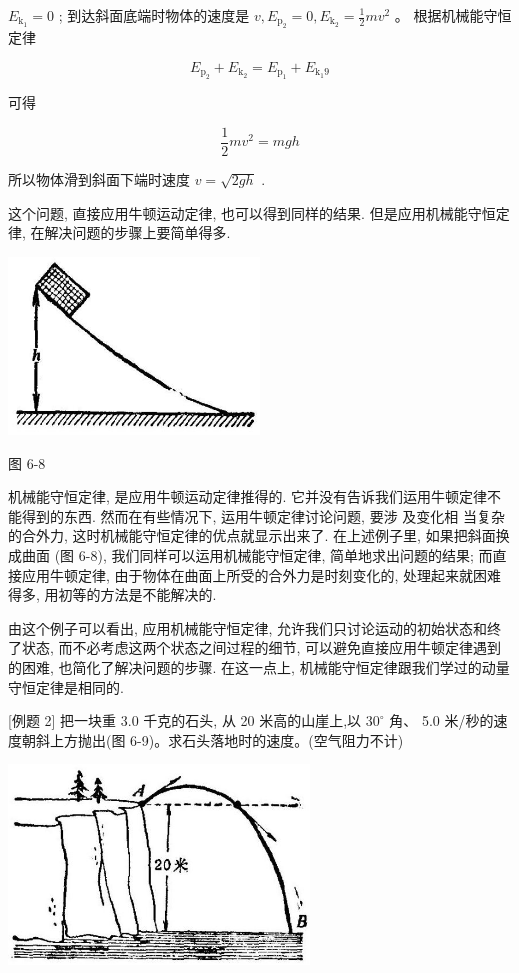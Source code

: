 \documentclass[10pt]{article}
\begin{document}
\({E}_{{\mathrm{k}}_{1}} = 0\) ; 到达斜面底端时物体的速度是 \(v,{E}_{{\mathrm{p}}_{2}} = 0,{E}_{{\mathrm{k}}_{2}} = \frac{1}{2}m{v}^{2}\) 。 根据机械能守恒定律

\[
{E}_{{\mathrm{p}}_{2}} + {E}_{{\mathrm{k}}_{2}} = {E}_{{\mathrm{p}}_{1}} + {E}_{{\mathrm{k}}_{1}9}
\]

可得

\[
\frac{1}{2}m{v}^{2} = {mgh}
\]

所以物体滑到斜面下端时速度 \(v = \sqrt{2gh}\) .

这个问题, 直接应用牛顿运动定律, 也可以得到同样的结果. 但是应用机械能守恒定律, 在解决问题的步骤上要简单得多.

\begin{center}
\includegraphics[max width=0.5\textwidth]{images/01912d55-147c-70aa-b0e0-1782a122f948_184_726188.jpg}
\end{center}

图 6-8

机械能守恒定律, 是应用牛顿运动定律推得的. 它并没有告诉我们运用牛顿定律不能得到的东西. 然而在有些情况下, 运用牛顿定律讨论问题, 要涉 及变化相 当复杂的合外力, 这时机械能守恒定律的优点就显示出来了. 在上述例子里, 如果把斜面换成曲面 (图 6-8), 我们同样可以运用机械能守恒定律, 简单地求出问题的结果; 而直接应用牛顿定律, 由于物体在曲面上所受的合外力是时刻变化的, 处理起来就困难得多, 用初等的方法是不能解决的.

由这个例子可以看出, 应用机械能守恒定律, 允许我们只讨论运动的初始状态和终了状态, 而不必考虑这两个状态之间过程的细节, 可以避免直接应用牛顿定律遇到的困难, 也简化了解决问题的步骤. 在这一点上, 机械能守恒定律跟我们学过的动量守恒定律是相同的.

[例题 2] 把一块重 3.0 千克的石头, 从 20 米高的山崖上,以 \({30}^{ \circ }\) 角、 5.0 米/秒的速度朝斜上方抛出(图 6-9)。求石头落地时的速度。(空气阻力不计)

\begin{center}
\includegraphics[max width=0.6\textwidth]{images/01912d55-147c-70aa-b0e0-1782a122f948_185_404986.jpg}
\end{center}
\end{document}
